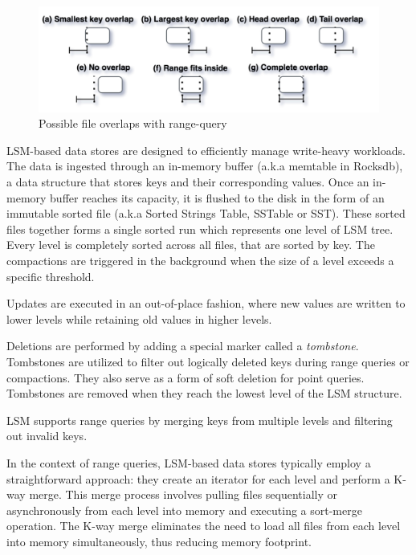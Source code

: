 \begin{figure}
    \includegraphics[scale=0.2]{Figures/File range overlaps.png}
    \caption{Possible file overlaps with range-query}\label{fig:file_range_overlaps}
\end{figure}

LSM-based data stores are designed to efficiently manage write-heavy workloads. The data is ingested through 
an in-memory buffer (a.k.a memtable in Rocksdb), a data structure that stores keys and their corresponding values. 
Once an in-memory buffer reaches its capacity, it is flushed to the disk in the form of an immutable sorted file (a.k.a Sorted Strings Table, SSTable or SST). 
These sorted files together forms a single sorted run which represents one level of LSM tree. Every level is completely sorted 
across all files, that are sorted by key. The compactions are triggered in the background when the size of a level exceeds a 
specific threshold.

 Updates are executed in an out-of-place fashion, where new values are written to lower levels 
while retaining old values in higher levels.

 Deletions are performed by adding a special marker called a \textit{tombstone}. Tombstones are 
utilized to filter out logically deleted keys during range queries or compactions. They also serve as a form of soft 
deletion for point queries. Tombstones are removed when they reach the lowest level of the LSM structure.

 LSM supports range queries by merging keys from multiple levels and filtering out 
invalid keys.

In the context of range queries, LSM-based data stores typically employ a straightforward approach: they create an 
iterator for each level and perform a K-way merge. This merge process involves pulling files sequentially or 
asynchronously from each level into memory and executing a sort-merge operation. The K-way merge eliminates the need 
to load all files from each level into memory simultaneously, thus reducing memory footprint.

